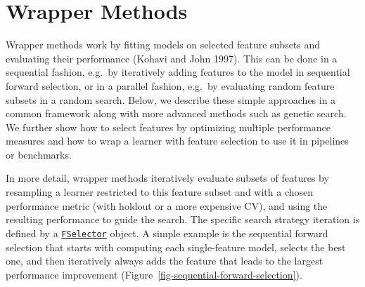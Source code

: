 \hypertarget{sec-fs-wrapper}{%
\section{Wrapper Methods}\label{sec-fs-wrapper}}

Wrapper methods work by fitting models on selected feature subsets and
evaluating their performance (Kohavi and John 1997). This can be done in
a sequential fashion, e.g.~by iteratively adding features to the model
in sequential forward selection, or in a parallel fashion, e.g.~by
evaluating random feature subsets in a random search. Below, we describe
these simple approaches in a common framework along with more advanced
methods such as genetic search. We further show how to select features
by optimizing multiple performance measures and how to wrap a learner
with feature selection to use it in pipelines or benchmarks.

In more detail, wrapper methods iteratively evaluate subsets of features
by resampling a learner restricted to this feature subset and with a
chosen performance metric (with holdout or a more expensive CV), and
using the resulting performance to guide the search. The specific search
strategy iteration is defined by a
\href{https://mlr3fselect.mlr-org.com/reference/FSelector.html}{\texttt{FSelector}}
object. A simple example is the sequential forward selection that starts
with computing each single-feature model, selects the best one, and then
iteratively always adds the feature that leads to the largest
performance improvement (Figure~\ref{fig-sequential-forward-selection}).

